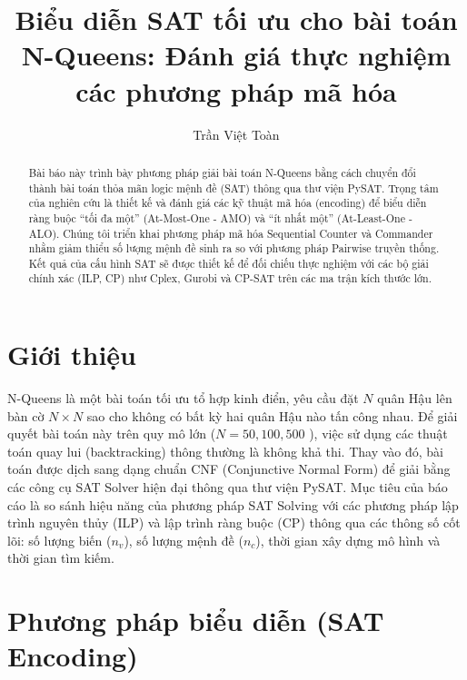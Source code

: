 \documentclass[a4paper,fleqn]{cas-sc}
\begin{document}

    \title[mode=title]{Biểu diễn SAT tối ưu cho bài toán N-Queens: Đánh giá thực nghiệm các phương pháp mã hóa}

    \author[1]{Trần Việt Toàn}
    \address[1]{Trường Đại học Công nghệ - ĐHQGHN}

    \begin{abstract}
        Bài báo này trình bày phương pháp giải bài toán N-Queens bằng cách chuyển đổi thành bài toán thỏa mãn logic mệnh
        đề (SAT) thông qua thư viện PySAT. Trọng tâm của nghiên cứu là thiết kế và đánh giá các kỹ thuật mã hóa
        (encoding) để biểu diễn ràng buộc ``tối đa một'' (At-Most-One - AMO) và ``ít nhất một'' (At-Least-One - ALO).
        Chúng tôi triển khai phương pháp mã hóa Sequential Counter và Commander nhằm giảm thiểu số lượng mệnh đề sinh ra
        so với phương
        pháp Pairwise truyền thống. Kết quả của cấu hình SAT sẽ được thiết kế để đối chiếu thực nghiệm với các bộ giải
        chính xác (ILP, CP) như Cplex, Gurobi và CP-SAT trên các ma trận kích thước lớn.
    \end{abstract}

    \maketitle


    \section{Giới thiệu}\label{sec:intro}
    N-Queens là một bài toán tối ưu tổ hợp kinh điển, yêu cầu đặt $N$ quân Hậu lên bàn cờ $N \times N$ sao cho không
    có bất kỳ hai quân Hậu nào tấn công nhau. Để giải quyết bài toán này trên quy mô lớn ($N = 50, 100, 500$
    ), việc sử dụng
    các thuật toán quay lui (backtracking) thông thường là không khả thi. Thay vào đó, bài toán được dịch sang dạng
    chuẩn
    CNF (Conjunctive Normal Form) để giải bằng các công cụ SAT Solver hiện đại thông qua thư viện PySAT. Mục tiêu của
    báo
    cáo là so sánh hiệu năng của phương pháp SAT Solving với các phương pháp lập trình nguyên thủy (ILP) và lập trình
    ràng buộc (CP) thông qua các thông số cốt lõi: số lượng biến ($n_v$), số lượng mệnh đề ($n_c$), thời gian xây dựng
    mô hình và thời gian tìm kiếm.


    \section{Phương pháp biểu diễn (SAT Encoding)}\label{sec:sat_encoding}
\end{document}
